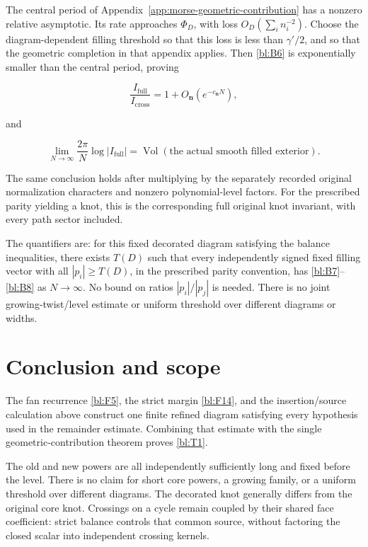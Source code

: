 The central period of Appendix~\ref{app:morse-geometric-contribution} has a nonzero
relative asymptotic. Its rate approaches \(\Phi_D\), with loss
\(O_D(\sum_i n_i^{-2})\). Choose the diagram-dependent filling
threshold so that this loss is less than \(\gamma'/2\), and so that
the geometric completion in that appendix applies. Then \eqref{bl:B6} is
exponentially smaller than the central period, proving

\begin{equation}\label{bl:B7}
\frac{I_{\mathrm{full}}}{I_{\mathrm{cross}}}
=1+O_{\mathbf n}(e^{-c_{\mathbf n}N}),
\end{equation}

and

\begin{equation}\label{bl:B8}
\lim_{N\to\infty}\frac{2\pi}{N}\log|I_{\mathrm{full}}|
=\operatorname{Vol}(\text{the actual smooth filled exterior}).
\end{equation}

The same conclusion holds after multiplying by the separately recorded original normalization characters and nonzero polynomial-level factors. For the prescribed parity yielding a knot, this is the corresponding full original knot invariant, with every path sector included.

The quantifiers are: for this fixed decorated diagram satisfying the balance inequalities, there exists \(T(D)\) such that every independently signed fixed filling vector with all \(|p_i|\geq T(D)\), in the prescribed parity convention, has \eqref{bl:B7}--\eqref{bl:B8} as \(N\to\infty\). No bound on ratios \(|p_i|/|p_j|\) is needed. There is no joint growing-twist/level estimate or uniform threshold over different diagrams or widths.

\section{Conclusion and scope}
\label{bl:exact-reproduction-and-limits}

The fan recurrence \eqref{bl:F5}, the strict margin \eqref{bl:F14},
and the insertion/source calculation above construct one finite refined
diagram satisfying every hypothesis used in the remainder estimate.
Combining that estimate with the single geometric-contribution theorem
proves \eqref{bl:T1}.

The old and new powers are all independently sufficiently long and fixed
before the level. There is no claim for short core powers, a growing
family, or a uniform threshold over different diagrams. The decorated
knot generally differs from the original core knot. Crossings on a cycle
remain coupled by their shared face coefficient: strict balance controls
that common source, without factoring the closed scalar into independent
crossing kernels.
